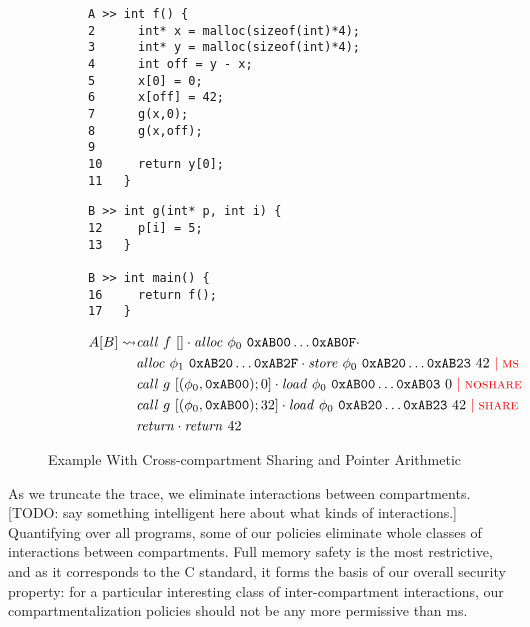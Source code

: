 \documentclass{article}
\begin{document}
\begin{figure}
  \begin{subfigure}{\textwidth}
    \begin{minipage}[t]{0.5\textwidth}
\begin{verbatim}
A >> int f() {
2      int* x = malloc(sizeof(int)*4);
3      int* y = malloc(sizeof(int)*4);
4      int off = y - x;
5      x[0] = 0;
6      x[off] = 42;
7      g(x,0);
8      g(x,off);
9
10     return y[0];
11   }
\end{verbatim}
    \end{minipage}
    \begin{minipage}[t]{0.4\textwidth}
\begin{verbatim}
B >> int g(int* p, int i) {
12     p[i] = 5;
13   }

B >> int main() {
16     return f();
17   }
\end{verbatim}
    \end{minipage}
  \end{subfigure}
  \begin{subfigure}{\textwidth}
    \[\begin{split}
    A[B] \rightsquigarrow & \mathit{call} ~ f ~ [] \cdot
    \mathit{alloc} ~ \phi_0 ~ \mathtt{0xAB00} \dots \mathtt{0xAB0F} \cdot \\
    & \mathit{alloc} ~ \phi_1 ~ \mathtt{0xAB20} \dots \mathtt{0xAB2F} \cdot
    \mathit{store} ~ \phi_0 ~ \mathtt{0xAB20} \dots \mathtt{0xAB23} ~ 42 ~
           {\color{red} \mid \textnormal{\sc ms}} \\
    & \mathit{call} ~ g ~ [(\phi_0, \mathtt{0xAB00}); 0] \cdot
    \mathit{load} ~ \phi_0 ~ \mathtt{0xAB00} \dots \mathtt{0xAB03} ~ 0 ~
           {\color{red} \mid \textnormal{\sc noshare}} \\
    & \mathit{call} ~ g ~ [(\phi_0, \mathtt{0xAB00}); 32] \cdot
    \mathit{load} ~ \phi_0 ~ \mathtt{0xAB20} \dots \mathtt{0xAB23} ~ 42 ~
           {\color{red} \mid \textnormal{\sc share}} \\
    & \mathit{return} \cdot \mathit{return} ~ 42 \\
    \end{split}\]
  \end{subfigure}
  
  \caption{Example With Cross-compartment Sharing and Pointer Arithmetic}
  \label{fig:trexample}
\end{figure}

As we truncate the trace, we eliminate interactions between compartments. 
[TODO: say something intelligent here about what kinds of interactions.]
Quantifying over all programs, some of our policies eliminate whole classes of interactions
between compartments. Full memory safety is the most restrictive, and as it corresponds
to the C standard, it forms the basis of our overall security property: for a particular
interesting class of inter-compartment interactions, our compartmentalization policies should
not be any more permissive than {\sc ms}.
\end{document}
